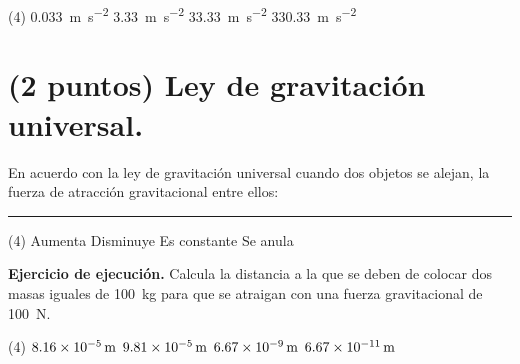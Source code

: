 \documentclass[12pt, letter]{exam}
\begin{document}
\begin{questions}
    \begin{tasks}(4)
        \task \SI{0.033}{\meter\per\square\second}
        \task \SI{3.33}{\meter\per\square\second}
        \task \SI{33.33}{\meter\per\square\second}
        \task \SI{330.33}{\meter\per\square\second}
    \end{tasks}

    \section{(2 puntos) Ley de gravitación universal.}

    \question En acuerdo con la ley de gravitación universal cuando dos objetos se alejan, la fuerza de atracción gravitacional entre ellos: \rule{2cm}{0.1mm}
    \begin{tasks}(4)
        \task Aumenta
        \task Disminuye
        \task Es constante
        \task Se anula
    \end{tasks}
    \question \label{Ejercicio_11} \textbf{Ejercicio de ejecución.} Calcula la distancia a la que se deben de colocar dos masas iguales de \SI{100}{\kilo\gram} para que se atraigan con una fuerza gravitacional de \SI{100}{\newton}.
    \begin{tasks}(4)
        \task $\SI{8.16d-5}{\meter}$
        \task $\SI{9.81d-5}{\meter}$
        \task $\SI{6.67d-9}{\meter}$
        \task $\SI{6.67d-11}{\meter}$
    \end{tasks}


\end{questions}
\end{document}
